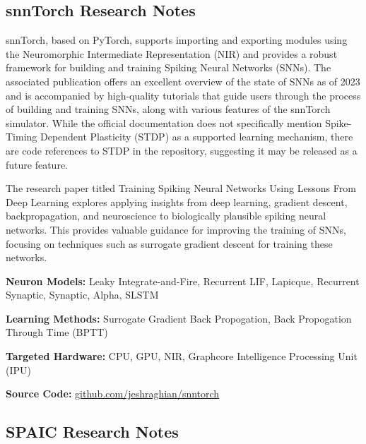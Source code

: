 \subsection*{snnTorch Research Notes}\label{snnTorch}

snnTorch, based on PyTorch, supports importing and exporting modules using the Neuromorphic Intermediate Representation (NIR) and provides a robust framework for building and training Spiking Neural Networks (SNNs). The associated publication offers an excellent overview of the state of SNNs as of 2023 and is accompanied by high-quality tutorials that guide users through the process of building and training SNNs, along with various features of the snnTorch simulator. While the official documentation does not specifically mention Spike-Timing Dependent Plasticity (STDP) as a supported learning mechanism, there are code references to STDP in the repository, suggesting it may be released as a future feature.

The research paper titled Training Spiking Neural Networks Using Lessons From Deep Learning explores applying insights from deep learning, gradient descent, backpropagation, and neuroscience to biologically plausible spiking neural networks. This provides valuable guidance for improving the training of SNNs, focusing on techniques such as surrogate gradient descent for training these networks.

\begin{tcolorbox}[enhanced,attach boxed title to top center={yshift=-3mm,yshifttext=-1mm}, colback=blue!5!white,colframe=blue!75!black,colbacktitle=red!80!black, title=snnTorch at a Glance,fonttitle=\bfseries, boxed title style={size=small,colframe=red!50!black} ]

\textbf{Neuron Models:} Leaky Integrate-and-Fire, Recurrent LIF, Lapicque, Recurrent Synaptic, Synaptic, Alpha, SLSTM

\textbf{Learning Methods:} Surrogate Gradient Back Propogation, Back Propogation Through Time (BPTT)  

\textbf{Targeted Hardware:} CPU, GPU, NIR, Graphcore Intelligence Processing Unit (IPU) 

\textbf{Source Code:} \href{https://github.com/jeshraghian/snntorch}{github.com/jeshraghian/snntorch}
\end{tcolorbox}
\subsection*{SPAIC Research Notes}\label{SPAIC}

